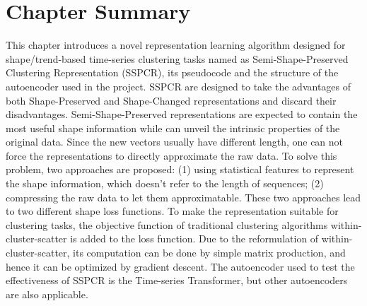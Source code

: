 \section{Chapter Summary}
This chapter introduces a novel representation learning algorithm designed for shape/trend-based time-series clustering tasks named as Semi-Shape-Preserved Clustering Representation (SSPCR), its pseudocode and the structure of the autoencoder used in the project. SSPCR are designed to take the advantages of both Shape-Preserved and Shape-Changed representations and discard their disadvantages. Semi-Shape-Preserved representations are expected to contain the most useful shape information while can unveil the intrinsic properties of the original data. Since the new vectors usually have different length, one can not force the representations to directly approximate the raw data. To solve this problem, two approaches are proposed: (1) using statistical features to represent the shape information, which doesn't refer to the length of sequences; (2) compressing the raw data to let them approximatable. These two approaches lead to two different shape loss functions. To make the representation suitable for clustering tasks, the objective function of traditional clustering algorithms within-cluster-scatter is added to the loss function. Due to the reformulation of within-cluster-scatter, its computation can be done by simple matrix production, and hence it can be optimized by gradient descent. The autoencoder used to test the effectiveness of SSPCR is the Time-series Transformer, but other autoencoders are also applicable. 